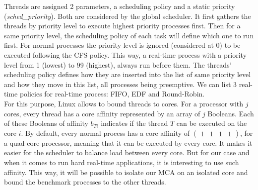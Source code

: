 \documentclass[french, a4paper, 11pt, twoside, pdftex]{StyleThese}
\begin{document}
                        Threads are assigned 2 parameters, a scheduling policy and a static priority (\textit{sched\_priority}). Both are considered by the global scheduler. It first gathers the threads by priority level to execute highest priority processes first. Then for a same priority level, the scheduling policy of each task will define which one to run first. For normal processes the priority level is ignored (considered at 0) to be executed following the CFS policy. This way, a real-time process with a priority level from 1 (lowest) to 99 (highest), always run before them. The threads' scheduling policy defines how they are inserted into the list of same priority level and how they move in this list, all processes being preemptive.  We can list 3 real-time policies for real-time process: FIFO, EDF and Round-Robin. \\
                        For this purpose, Linux allows to bound threads to cores. For a processor with $j$ cores, every thread has a core affinity represented by an array of $j$ Booleans. Each of these Booleans of affinity $b_{Ti}$ indicates if the thread $T$ can be executed on the core $i$. By default, every normal process has a core affinity of $\begin{pmatrix}1 & 1 & 1 & 1\end{pmatrix}$, for a quad-core processor, meaning that it can be executed by every core. It makes it easier for the scheduler to balance load between every core. But for our case and when it comes to run hard real-time applications, it is interesting to use such affinity. This way, it will be possible to isolate our MCA on an isolated core and bound the benchmark processes to the other threads.
            
\end{document}
